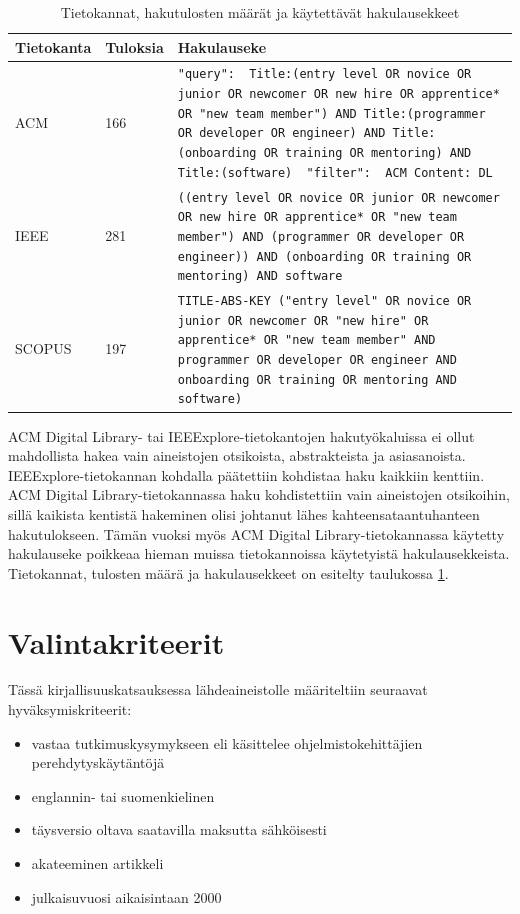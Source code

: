 \documentclass[utf8]{gradu3}
\begin{document}
\begin{table}[h]
    \footnotesize
    \begin{tabular}{llp{}}
        \toprule
        {Tietokanta} & Tuloksia & Hakulauseke \\
        \midrule
        ACM & 166 & {\tt "query": { Title:(entry level OR novice OR junior OR newcomer OR new hire OR apprentice* OR "new team member") AND Title:(programmer OR developer OR engineer) AND Title:(onboarding OR training OR mentoring) AND Title:(software) } "filter": { ACM Content: DL }  } \\
        \midrule
        IEEE & 281 & {\tt ((entry level OR novice OR junior OR newcomer OR new hire OR apprentice* OR "new team member") AND (programmer OR  developer OR engineer)) AND (onboarding OR training OR mentoring) AND software } \\
        \midrule
        SCOPUS & 197 & {\tt TITLE-ABS-KEY ("entry level"  OR  novice  OR  junior  OR  newcomer OR "new hire"  OR  apprentice* OR "new team member"  AND  programmer  OR  developer  OR  engineer  AND  onboarding  OR  training  OR  mentoring  AND  software)  } \\
        \bottomrule
    \end{tabular}  
    \caption{Tietokannat, hakutulosten määrät ja käytettävät hakulausekkeet}
    \label{tbl:tietokannat}
\end{table}

ACM Digital Library- tai IEEExplore-tietokantojen hakutyökaluissa ei ollut mahdollista hakea vain aineistojen otsikoista, abstrakteista ja asiasanoista. IEEExplore-tietokannan kohdalla päätettiin kohdistaa haku kaikkiin kenttiin. ACM Digital Library-tietokannassa haku kohdistettiin vain aineistojen otsikoihin, sillä kaikista kentistä hakeminen olisi johtanut lähes kahteensataantuhanteen hakutulokseen. Tämän vuoksi myös ACM Digital Library-tietokannassa käytetty hakulauseke poikkeaa hieman muissa tietokannoissa käytetyistä hakulausekkeista. Tietokannat, tulosten määrä ja hakulausekkeet on esitelty taulukossa \ref{tbl:tietokannat}.

\section{Valintakriteerit}

Tässä kirjallisuuskatsauksessa lähdeaineistolle määriteltiin seuraavat hyväksymiskriteerit:

\begin{itemize}
    \item vastaa tutkimuskysymykseen eli käsittelee ohjelmistokehittäjien perehdytyskäytäntöjä
    \item englannin- tai suomenkielinen
    \item täysversio oltava saatavilla maksutta sähköisesti
    \item akateeminen artikkeli
    \item julkaisuvuosi aikaisintaan 2000
\end{itemize}
\end{document}

